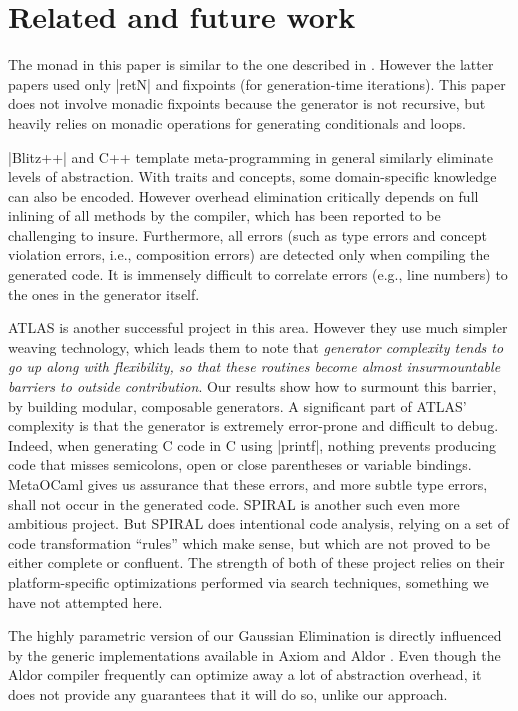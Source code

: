 \documentclass[draft]{elsart}
\begin{document}
\section{Related and future work}\label{related}

The monad in this paper is similar to the one described in
\cite{MSP:PADL04,KiselyovTaha}.  However the latter papers used only
|retN| and fixpoints (for generation-time iterations).  This paper
does not involve monadic fixpoints because the generator is not
recursive, but heavily relies on monadic operations for generating
conditionals and loops.

|Blitz++| \cite{Veldhuizen:1998:ISCOPE} and {C++} template
meta-programming in general similarly eliminate levels
of abstraction.  With traits and concepts, some domain-specific
knowledge can also be encoded.  However overhead elimination
critically depends on full inlining of all methods by the compiler,
which has been reported to be challenging to insure. Furthermore, all
errors (such as type errors and concept violation errors, i.e.,
composition errors) are detected only when compiling the generated
code. It is immensely difficult to correlate errors (e.g., line
numbers) to the ones in the generator itself.

ATLAS \cite{ATLAS} is another successful project in this area.
However they use much simpler weaving technology, which leads them to
note that \emph{generator complexity tends to go up along with
  flexibility, so that these routines become almost insurmountable
  barriers to outside contribution}. Our results show how to surmount
this barrier, by building modular, composable generators. A
significant part of ATLAS' complexity is that the generator is
extremely error-prone and difficult to debug.  Indeed, when generating
C code in C using |printf|, nothing prevents producing code that
misses semicolons, open or close parentheses or variable
bindings. MetaOCaml gives us assurance that these errors, and more
subtle type errors, shall not occur in the generated code.  SPIRAL
\cite{Pueschel:05} is another such even more ambitious project.  But
SPIRAL does intentional code analysis, relying on a set of code
transformation ``rules'' which make sense, but which are not proved to
be either complete or confluent.  The strength of both of these
project relies on their platform-specific optimizations performed via
search techniques, something we have not attempted here.

The highly parametric version of our Gaussian Elimination is directly
influenced by the generic implementations available in Axiom
\cite{Axiom} and Aldor \cite{Watt:2002:HCA}.  Even though the Aldor
compiler frequently can optimize away a lot of abstraction overhead, 
it does not provide any guarantees that it will do so, unlike our
approach.
\end{document}
